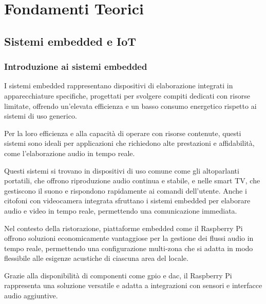 
%

\chapter{Fondamenti Teorici}


\section{Sistemi embedded e IoT}

\subsection{Introduzione ai sistemi embedded}
\noindent

I sistemi embedded rappresentano dispositivi di elaborazione integrati in apparecchiature specifiche, progettati per svolgere compiti dedicati con risorse limitate, offrendo un’elevata efficienza e un basso consumo energetico rispetto ai sistemi di uso generico.

Per la loro efficienza e alla capacità di operare con risorse contenute, questi sistemi sono ideali per applicazioni che richiedono alte prestazioni e affidabilità, come l’elaborazione audio in tempo reale.

Questi sistemi si trovano in dispositivi di uso comune come gli altoparlanti portatili, che offrono riproduzione audio continua e stabile, e nelle smart TV, che gestiscono il suono e rispondono rapidamente ai comandi dell’utente. Anche i citofoni con videocamera integrata sfruttano i sistemi embedded per elaborare audio e video in tempo reale, permettendo una comunicazione immediata.

Nel contesto della ristorazione, piattaforme embedded come il Raspberry Pi offrono soluzioni economicamente vantaggiose per la gestione dei flussi audio in tempo reale, permettendo una configurazione multi-zona che si adatta in modo flessibile alle esigenze acustiche di ciascuna area del locale.

Grazie alla disponibilità di componenti come \gls{gpio} e \gls{dac}, il Raspberry Pi rappresenta una soluzione versatile e adatta a integrazioni con sensori e interfacce audio aggiuntive. \cite{magpi2020}

